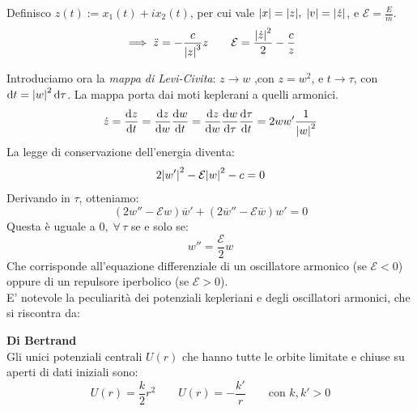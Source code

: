 Definisco $z(t):=x_1(t)+ix_2(t)$, per cui vale $\abs{x}= \abs{z}, \;\abs{v}= \abs{\dot{z}}$, e $\mathcal{E}=\frac{E}{m}$.
\begin{equation}
    \implies \ddot{z}= -\frac{c}{\abs{z}^3}z \qquad \mathcal{E}= \frac{\abs{\dot{z}}^2}{2}-\frac{c}{z}
\end{equation}

Introduciamo ora la \textit{mappa di Levi-Civita}: $z\rightarrow w$ ,con $z = w^2$, e $t\rightarrow \tau$, con $\dd{t}= \abs{w}^2\dd{\tau}$.
La mappa porta dai moti keplerani a quelli armonici.
\begin{equation}
    \dot{z}= \dv{z}{t}= \dv{z}{w}\dv{w}{t}= \dv{z}{w}\dv{w}{\tau}\dv{\tau}{t}= 2 w w' \frac{1}{\abs{w}^2}
\end{equation}
La legge di conservazione dell'energia diventa:
\begin{equation}
    2\abs{w'}^2-\mathcal{E}\abs{w}^2-c=0
\end{equation}
Derivando in $\tau$, otteniamo:
\begin{equation}
    \left( 2w'' - \mathcal{E}w \right)\overline{w}' + \left( 2\overline{w}'' - \mathcal{E}\overline{w} \right)w' = 0
\end{equation}
Questa è uguale a $0, \;\forall\,\tau$ se e solo se:
\begin{equation}
    w''=\frac{\mathcal{E}}{2}w
\end{equation}
Che corrisponde all'equazione differenziale di un oscillatore armonico (se $\mathcal{E}<0$) oppure di un repulsore iperbolico (se $\mathcal{E}>0$).\\
E' notevole la peculiarità dei potenziali kepleriani e degli oscillatori armonici, che si riscontra da:
\begin{theorem}
    \textbf{Di Bertrand}\\
    Gli unici potenziali centrali $U(r)$ che hanno tutte le orbite limitate e chiuse su aperti di dati iniziali sono:
    \begin{equation}
        U(r)= \frac{k}{2}r^2 \qquad U(r)= -\frac{k'}{r} \qquad \text{con } k,k'>0
    \end{equation}
\end{theorem}



